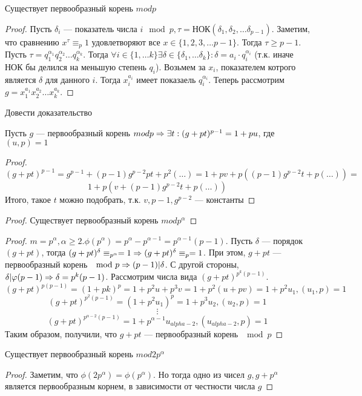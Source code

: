 \begin{proposition}
    Существует первообразный корень \(mod p\)
\end{proposition}
\begin{proof}
    Пусть \(\delta_i\) --- показатель числа \(i \mod p, \tau = \text{НОК}(\delta_1, \delta_2, \dots \delta_{p - 1})\). Заметим, что сравнению \(x^\tau \equiv_p 1\) удовлетворяют все \(x \in \{1, 2, 3, \dots p - 1\}\). Тогда \(\tau \ge p - 1\). Пусть \(\tau = q_1^{\alpha_1}q_2^{\alpha_2}\dots q_k^{\alpha_k}\). Тогда \(\forall i \in \{1, \dots k\} \exists \delta \in \{\delta_1, \dots \delta_k\}: \delta = a_i \cdot q_i^{\alpha_i}\) (т.к. иначе НОК бы делился на меньшую степень \(q_i\)). Возьмем за \(x_i\), показателем котрого является \(\delta\) для данного \(i\). Тогда \(x_i^{a_i}\) имеет показаель \(q_i^{\alpha_i}\). Теперь рассмотрим \(g = x_1^{a_1}x_2^{a_2}\dots x_k^{a_k}\).
\end{proof}
\begin{exercise}
    Довести доказательство
\end{exercise}

\begin{lemma}
    Пусть  \(g\) --- первообразный корень \(mod p \Rightarrow \exists t: (g + pt)^{p - 1} = 1 + pu\), где \((u, p) = 1\)
\end{lemma}
\begin{proof}
    \[(g + pt)^{p - 1} = g^{p - 1} + (p - 1)g^{p - 2}pt + p^2(\dots) = 1 + pv + p\left((p - 1)g^{p - 2}t + p(\dots)\right) =\]
    \[1 + p\left(v + (p - 1)g^{p - 2}t + p(\dots)\right)\]
    Итого, такое \(t\) можно подобрать, т.к.  \(v, p-1, g^{p - 2}\) --- константы
\end{proof}
\begin{proof}
    Существует первообразный корень \(mod p^\alpha\)
\end{proof}
\begin{proof}
    \(m = p^\alpha, \alpha \ge 2. \phi(p^\alpha) = p^\alpha - p^{\alpha - 1} = p^{\alpha - 1}(p - 1)\). Пусть \(\delta\) --- порядок \((g + pt)\), тогда \((g + pt)^\delta \equiv_{p^\alpha} = 1 \Rightarrow (g + pt)^\delta \equiv_{p} = 1\). При этом, \(g + pt\) --- первообразный корень  \(\mod p \Rightarrow (p - 1) | \delta\). С другой стороны, \(\delta | \varphi(p - 1) \Rightarrow \delta = p^k(p - 1)\). Рассмотрим числа вида \((g + pt)^{p^k(p - 1)}\).
    \[(g + pt)^{p(p - 1)} = (1 + pk)^p = 1 + p^2u + p^3v = 1 + p^2(u + pv) = 1 + p^2u_1, (u_1, p) = 1\]
    \[(g + pt)^{p^2(p - 1)} = (1 + p^2u_1)^p = 1 + p^3u_2, (u_2, p) = 1\]
    \[\vdots\]
    \[(g + pt)^{p^{\alpha - 2}(p - 1)} = 1 + p^{\alpha - 1}u_{alpha - 2}, (u_{alpha - 2}, p) = 1\]
    Таким образом, получили, что \(g + pt\) --- первообразный корень \(\mod p\)
\end{proof}
\begin{proposition}
    Существует первообразный корень \(mod 2p^\alpha\)
\end{proposition}
\begin{proof}
    Заметим, что \(\phi(2p^{\alpha}) = \phi(p^\alpha)\). Но тогда одно из чисел \(g, g + p^\alpha\) является первообразным корнем, в зависимости от честности числа \(g\)
\end{proof}

